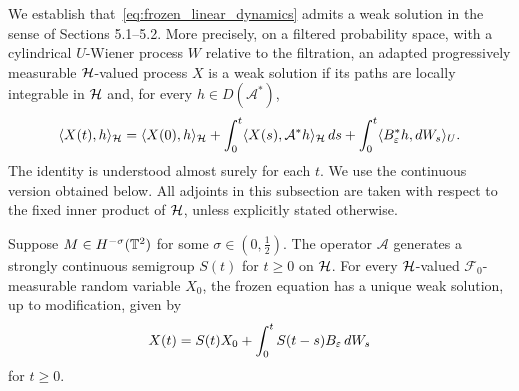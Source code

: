 We establish that~\eqref{eq:frozen_linear_dynamics} admits a weak solution in the sense of \cite{DaPrato_Zabczyk_2014} Sections 5.1--5.2. More precisely, on a filtered probability space, with a cylindrical \(U\)-Wiener process \(W\) relative
to the filtration, an adapted progressively measurable
\(\mathcal{H}\)-valued process \(X\) is a weak solution if its paths are locally
integrable in \(\mathcal{H}\) and, for every \(h\in D(\mathcal A^*)\),
\begin{equation}\label{eq:weak_frozen}
 \langle X(t),h\rangle_{\mathcal{H}}
 =\langle X(0),h\rangle_{\mathcal H}
  +\int_0^t\langle X(s),\mathcal A^*h\rangle_{\mathcal{H}}\,ds
  +\int_0^t\langle B_\varepsilon^*h,dW_s\rangle_U .
\end{equation}
The identity is understood almost surely for each \(t\). We use
the continuous version obtained below. All adjoints in this
subsection are taken with respect to the fixed inner product of
\(\mathcal{H}\), unless explicitly stated otherwise.

\begin{proposition}\label{prop:mild}
Suppose $M\in H^{-\sigma}(\mathbb{T}^2)$ for some $\sigma\in(0,\frac12)$.
The operator \(\mathcal A\) generates a strongly continuous semigroup \(S(t)\) for \(t\geq0\) on \(\mathcal{H}\).
For every \(\mathcal{H}\)-valued \(\mathcal F_0\)-measurable random variable
\(X_0\), the frozen equation has a unique weak solution, up to
modification, given by
\begin{equation}\label{eq:mild}
 X(t)=S(t)X_0+\int_0^t S(t-s)B_\varepsilon\,dW_s
\end{equation}
for $t \geq 0$.

\noindent
\end{proposition}

